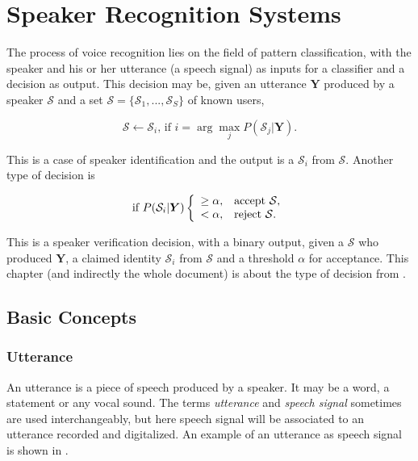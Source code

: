 \chapter{Speaker Recognition Systems}

The process of voice recognition lies on the field of pattern classification, with the speaker and his or her utterance (a speech signal) as inputs for a classifier and a decision as output. This decision may be, given an utterance $\boldsymbol{Y}$ produced by a speaker $\mathcal{S}$ and a set $\boldsymbol{\mathcal{S}} = \{\mathcal{S}_1, ..., \mathcal{S}_S\}$ of known users,

\begin{equation}
    \mathcal{S} \gets \mathcal{S}_i \text{, if } i = \arg\max_j P(\mathcal{S}_j|\boldsymbol{Y}).
    \label{eq:decision_speaker_identification}
\end{equation}

\noindent This is a case of speaker identification and the output is a $\mathcal{S}_i$ from $\boldsymbol{\mathcal{S}}$. Another type of decision is

\begin{equation}
    \text{if } P(\mathcal{S}_i|\boldsymbol{Y}) \verifytest{\alpha}{\mathcal{S}}
    \label{eq:decision_speaker_verification}
\end{equation}

\noindent This is a speaker verification decision, with a binary output, given a $\mathcal{S}$ who produced $\boldsymbol{Y}$, a claimed identity $\mathcal{S}_i$ from $\boldsymbol{\mathcal{S}}$ and a threshold $\alpha$ for acceptance. This chapter (and indirectly the whole document) is about the type of decision from .

\section{Basic Concepts}

\subsection{Utterance}

An utterance is a piece of speech produced by a speaker. It may be a word, a statement or any vocal sound. The terms \emph{utterance} and \emph{speech signal} sometimes are used interchangeably, but here speech signal will be associated to an utterance recorded and digitalized. An example of an utterance as speech signal is shown in .

